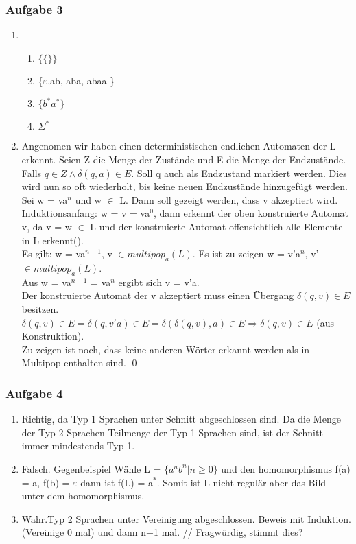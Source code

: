 \documentclass[12pt]{scrartcl}
\begin{document}
\subsubsection{Aufgabe 3}
	\begin{enumerate}
		\item 
		\begin{enumerate}
			\item \(\{\{\}\}\)
			\item \{$\varepsilon$,ab, aba, abaa \}
			\item \(\{ b^{*}a^{*}\}\)
			\item \( \Sigma^{*}\)
		\end{enumerate}
		\item Angenomen wir haben einen deterministischen endlichen Automaten der L erkennt. Seien Z die Menge der Zustände und E die Menge der Endzustände. Falls \( q \in Z \land \delta(q,a) \in E  \). Soll q auch als Endzustand markiert werden. Dies wird nun so oft wiederholt, bis keine neuen Endzustände hinzugefügt werden.\\
		Sei w = va$^{n}$ und w $\in$ L.  Dann soll gezeigt werden, dass v akzeptiert wird.  \\ 
		
		Induktionsanfang: w = v = va$^{0}$, dann erkennt der oben konstruierte Automat v, da v = w $\in$ L und der konstruierte Automat offensichtlich alle Elemente in L erkennt().\\ 
		
		Es gilt: w = va$^{n-1}$, v \(\in multipop_a(L)\). Es ist zu zeigen w = v'a$^{n}$, v'\(\in multipop_a(L)\). \\ 
		Aus w = va$^{n-1}$ = va$^{n}$ ergibt sich v = v'a. \\ Der konstruierte Automat der v akzeptiert muss einen Übergang \( \delta(q, v) \in E \) besitzen. \(\delta(q, v) \in E =\delta(q, v'a) \in E = \delta(\delta(q,v), a) \in E \Rightarrow \delta(q,v) \in E\) (aus Konstruktion).\\
		
		Zu zeigen ist noch, dass keine anderen Wörter erkannt werden als in Multipop enthalten sind.
		\qed	
	\end{enumerate}

\subsubsection{Aufgabe 4}
	\begin{enumerate}
		\item Richtig, da Typ 1 Sprachen unter Schnitt abgeschlossen sind. Da die Menge der Typ 2 Sprachen Teilmenge der Typ 1 Sprachen sind, ist der Schnitt immer mindestends Typ 1. 
		\item Falsch. Gegenbeispiel Wähle L = \(\{ a^{n}b^{n} | n \ge 0 \}\) und den homomorphismus f(a) = a, f(b) = $\varepsilon$ dann ist f(L) = a$^{*}$. Somit ist L nicht regulär aber das Bild unter dem homomorphismus. 
		\item Wahr.Typ 2 Sprachen unter Vereinigung abgeschlossen. Beweis mit Induktion. (Vereinige 0 mal) und dann n+1 mal. // Fragwürdig, stimmt dies? 
	\end{enumerate}
	
\end{document}

